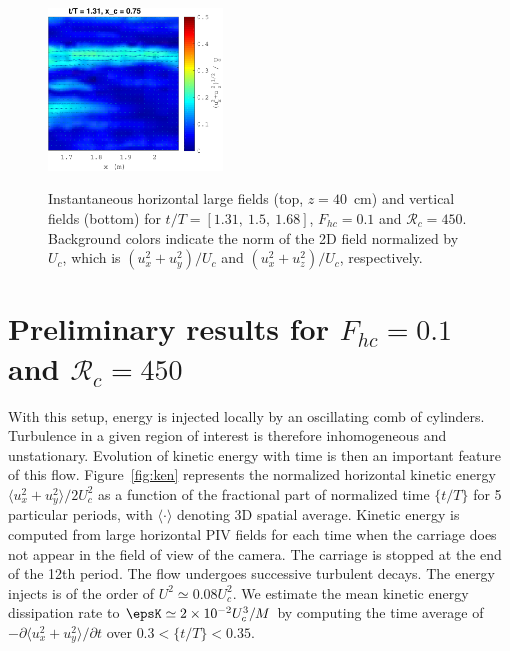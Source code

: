 \begin{figure}[htb]
{\includegraphics[width=4.63cm]{paper_05_milestone_issf/Figures/exp21/vv_400.pdf}
}
\vspace{-2mm}
\caption{Instantaneous horizontal large fields (top, $z=40$~cm) and vertical
fields (bottom) for $t/T = [1.31,~1.5,~1.68]$, $F_{hc} = 0.1$ and
$\mathcal{R}_c=450$. Background colors indicate the norm of the 2D field
normalized by $U_c$, which is $(u_x^2 + u_y^2)/U_c$ and $(u_x^2 + u_z^2)/U_c$,
respectively.}
\label{fig:field}
\end{figure}


\section{Preliminary results for $F_{hc} = 0.1$ and $\mathcal{R}_c=450$}

With this setup, energy is injected locally by an oscillating comb of
cylinders. Turbulence in a given region of interest is therefore inhomogeneous
and unstationary. Evolution of kinetic energy with time is then an important
feature of this flow. Figure~\ref{fig:ken} represents the normalized horizontal
kinetic energy $\langle u_x^2 + u_y^2 \rangle/2U_c^2$ as a function of the
fractional part of normalized time $\{t/T\}$ for 5 particular periods, with
$\langle\cdot\rangle$ denoting 3D spatial average. Kinetic energy is computed
from large horizontal PIV fields for each time when the carriage does not
appear in the field of view of the camera. The carriage is stopped at the end
of the 12th period. The flow undergoes successive turbulent decays. The energy
injects is of the order of $U^2 \simeq 0.08 U_c^2$.
%
We estimate the mean kinetic energy dissipation rate to
$\epsK \simeq 2 \times 10^{-2} U_c^3/M$ by computing the time average of
$-\partial\langle u_x^2+u_y^2\rangle/\partial t$ over $0.3 < \{t/T\} < 0.35$.


